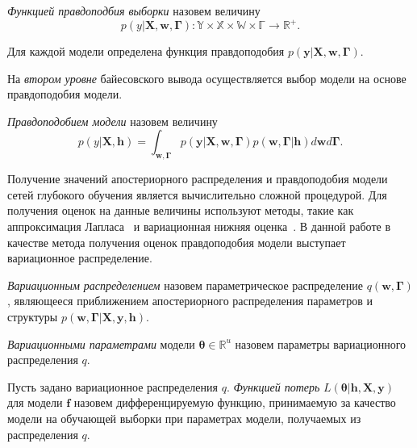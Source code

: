 \begin{defin}
\textit{Функцией правдоподбия выборки } назовем величину
\[
    p(y|\mathbf{X}, \mathbf{w}, \boldsymbol{\Gamma}): \mathbb{Y} \times \mathbb{X} \times \mathbb{W} \times \mathbb{\Gamma} \to \mathbb{R}^{+}.
\]
\end{defin}
Для каждой модели определена функция правдоподобия  $p(\mathbf{y}|\mathbf{X}, \mathbf{w}, \boldsymbol{\Gamma})$.
 
На \textit{втором уровне} байесовского вывода осуществляется выбор модели на основе правдоподобия модели.
\begin{defin}
\textit{Правдоподобием модели }назовем величину
\begin{equation}
\label{eq:evidence}
p(y|\mathbf{X}, \mathbf{h}) = \int_{\mathbf{w}, \boldsymbol{\Gamma}} p(\mathbf{y}|\mathbf{X}, \mathbf{w}, \boldsymbol{\Gamma})p(\mathbf{w}, \boldsymbol{\Gamma}|\mathbf{h})d\mathbf{w}d\boldsymbol{\Gamma}.
\end{equation}
\end{defin}
Получение значений апостериорного распределения и правдоподобия модели сетей глубокого обучения является вычислительно сложной процедурой. Для получения оценок на данные величины используют методы, такие как аппроксимация Лапласа~\cite{tokmakova} и вариационная нижняя оценка~\cite{nips}.  В данной работе в качестве метода получения оценок правдоподобия модели выступает вариационное распределение.

\begin{defin}
\textit{Вариационным распределением} назовем параметрическое распределение $q(\mathbf{w}, \boldsymbol{\Gamma})$, являющееся приближением  апостериорного распределения параметров и структуры $p(\mathbf{w}, \boldsymbol{\Gamma}|\mathbf{X}, \mathbf{y}, \mathbf{h}).$ 
\end{defin}

\begin{defin}
\textit{Вариационными параметрами} модели $\boldsymbol{\theta} \in \mathbb{R}^u$ назовем параметры вариационного распределения $q$.
\end{defin} 

\begin{defin}
\label{def:l}
Пусть задано вариационное распределения $q$.
\textit{Функцией потерь} $L( \boldsymbol{\theta}| \mathbf{h}, \mathbf{X}, \mathbf{y})$ для модели $\mathbf{f}$ назовем дифференцируемую функцию, принимаемую за качество модели на обучающей выборки при параметрах модели, получаемых из  распределения $q$.
\end{defin}

